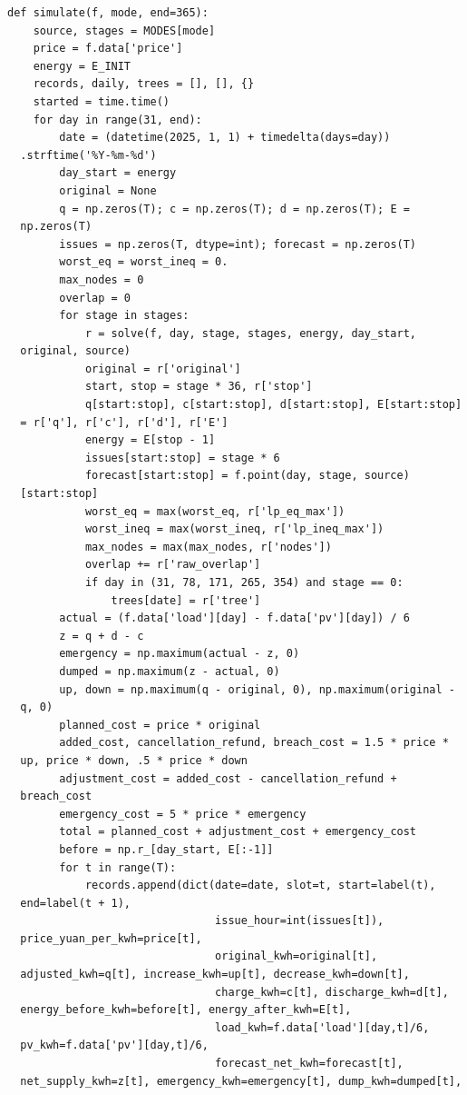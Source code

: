 \begin{verbatim}
def simulate(f, mode, end=365):
    source, stages = MODES[mode]
    price = f.data['price']
    energy = E_INIT
    records, daily, trees = [], [], {}
    started = time.time()
    for day in range(31, end):
        date = (datetime(2025, 1, 1) + timedelta(days=day))
  .strftime('%Y-%m-%d')
        day_start = energy
        original = None
        q = np.zeros(T); c = np.zeros(T); d = np.zeros(T); E =
  np.zeros(T)
        issues = np.zeros(T, dtype=int); forecast = np.zeros(T)
        worst_eq = worst_ineq = 0.
        max_nodes = 0
        overlap = 0
        for stage in stages:
            r = solve(f, day, stage, stages, energy, day_start,
  original, source)
            original = r['original']
            start, stop = stage * 36, r['stop']
            q[start:stop], c[start:stop], d[start:stop], E[start:stop]
  = r['q'], r['c'], r['d'], r['E']
            energy = E[stop - 1]
            issues[start:stop] = stage * 6
            forecast[start:stop] = f.point(day, stage, source)
  [start:stop]
            worst_eq = max(worst_eq, r['lp_eq_max'])
            worst_ineq = max(worst_ineq, r['lp_ineq_max'])
            max_nodes = max(max_nodes, r['nodes'])
            overlap += r['raw_overlap']
            if day in (31, 78, 171, 265, 354) and stage == 0:
                trees[date] = r['tree']
        actual = (f.data['load'][day] - f.data['pv'][day]) / 6
        z = q + d - c
        emergency = np.maximum(actual - z, 0)
        dumped = np.maximum(z - actual, 0)
        up, down = np.maximum(q - original, 0), np.maximum(original -
  q, 0)
        planned_cost = price * original
        added_cost, cancellation_refund, breach_cost = 1.5 * price *
  up, price * down, .5 * price * down
        adjustment_cost = added_cost - cancellation_refund +
  breach_cost
        emergency_cost = 5 * price * emergency
        total = planned_cost + adjustment_cost + emergency_cost
        before = np.r_[day_start, E[:-1]]
        for t in range(T):
            records.append(dict(date=date, slot=t, start=label(t),
  end=label(t + 1),
                                issue_hour=int(issues[t]),
  price_yuan_per_kwh=price[t],
                                original_kwh=original[t],
  adjusted_kwh=q[t], increase_kwh=up[t], decrease_kwh=down[t],
                                charge_kwh=c[t], discharge_kwh=d[t],
  energy_before_kwh=before[t], energy_after_kwh=E[t],
                                load_kwh=f.data['load'][day,t]/6,
  pv_kwh=f.data['pv'][day,t]/6,
                                forecast_net_kwh=forecast[t],
  net_supply_kwh=z[t], emergency_kwh=emergency[t], dump_kwh=dumped[t],

\end{verbatim}
